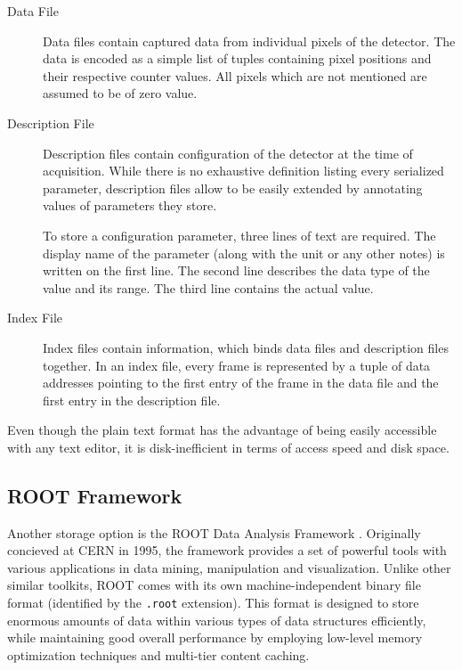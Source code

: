 \begin{description}
	\item[Data File]
	Data files contain captured data from individual pixels of the detector. The data is encoded as a simple list of tuples containing pixel positions and their respective counter values. All pixels which are not mentioned are assumed to be of zero value.

	\item[Description File]
	Description files contain configuration of the detector at the time of acquisition. While there is no exhaustive definition listing every serialized parameter, description files allow to be easily extended by annotating values of parameters they store.

	To store a configuration parameter, three lines of text are required. The display name of the parameter (along with the unit or any other notes) is written on the first line. The second line describes the data type of the value and its range. The third line contains the actual value.

	\item[Index File]
	Index files contain information, which binds data files and description files together. In an index file, every frame is represented by a tuple of data addresses pointing to the first entry of the frame in the data file and the first entry in the description file.
\end{description}

Even though the plain text format has the advantage of being easily accessible with any text editor, it is disk-inefficient in terms of access speed and disk space.

\subsection{ROOT Framework}
Another storage option is the ROOT Data Analysis Framework \cite{Brun199781}. Originally concieved at CERN in 1995, the framework provides a set of powerful tools with various applications in data mining, manipulation and visualization. Unlike other similar toolkits, ROOT comes with its own machine-independent binary file format (identified by the \texttt{.root} extension). This format is designed to store enormous amounts of data within various types of data structures efficiently, while maintaining good overall performance by employing low-level memory optimization techniques and multi-tier content caching.


